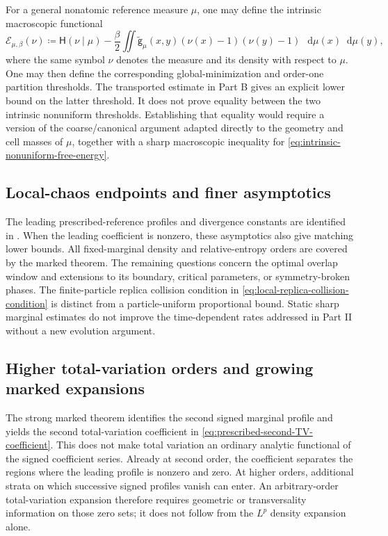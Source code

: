 \documentclass[11pt,reqno]{amsart}
\numberwithin{equation}{section}
\theoremstyle{plain}
\theoremstyle{definition}
\newcommand{\dd}{\mathop{}\!\mathrm d}
\newcommand{\be}{\beta}
\newcommand{\g}{\mathsf g}
\newcommand{\Hr}{\mathsf H}
\newcommand{\Ec}{\mathcal E}
\newcommand{\tl}{\widetilde}
\begin{document}
For a general nonatomic reference measure $\mu$, one may define the intrinsic macroscopic functional
\begin{equation}
 \Ec_{\mu,\be}(\nu)
 \coloneqq\Hr(\nu\mid\mu)
 -\frac\be2\iint\tl{\g}_{\mu}(x,y)
 (\nu(x)-1)(\nu(y)-1)\,\dd\mu(x)\dd\mu(y),
 \label{eq:intrinsic-nonuniform-free-energy}
\end{equation}
where the same symbol $\nu$ denotes the measure and its density with respect to $\mu$.  One may then define the corresponding global-minimization and order-one partition thresholds.  The transported estimate in Part B gives an explicit lower bound on the latter threshold.  It does not prove equality between the two intrinsic nonuniform thresholds.  Establishing that equality would require a version of the coarse/canonical argument adapted directly to the geometry and cell masses of $\mu$, together with a sharp macroscopic inequality for \eqref{eq:intrinsic-nonuniform-free-energy}.


\subsection{Local-chaos endpoints and finer asymptotics}
\label{subsec:local-chaos-perspectives}


The leading prescribed-reference profiles and divergence constants are identified in . When the leading coefficient is nonzero, these asymptotics also give matching lower bounds. All fixed-marginal density and relative-entropy orders are covered by the marked theorem. The remaining questions concern the optimal overlap window and extensions to its boundary, critical parameters, or symmetry-broken phases. The finite-particle replica collision condition in \eqref{eq:local-replica-collision-condition} is distinct from a particle-uniform proportional bound. Static sharp marginal estimates do not improve the time-dependent rates addressed in Part II without a new evolution argument.



\subsection{Higher total-variation orders and growing marked expansions}

The strong marked theorem identifies the second signed marginal profile and yields the second total-variation coefficient in \eqref{eq:prescribed-second-TV-coefficient}.  This does not make total variation an ordinary analytic functional of the signed coefficient series.  Already at second order, the coefficient separates the regions where the leading profile is nonzero and zero.  At higher orders, additional strata on which successive signed profiles vanish can enter.  An arbitrary-order total-variation expansion therefore requires geometric or transversality information on those zero sets; it does not follow from the $L^p$ density expansion alone.
\end{document}
